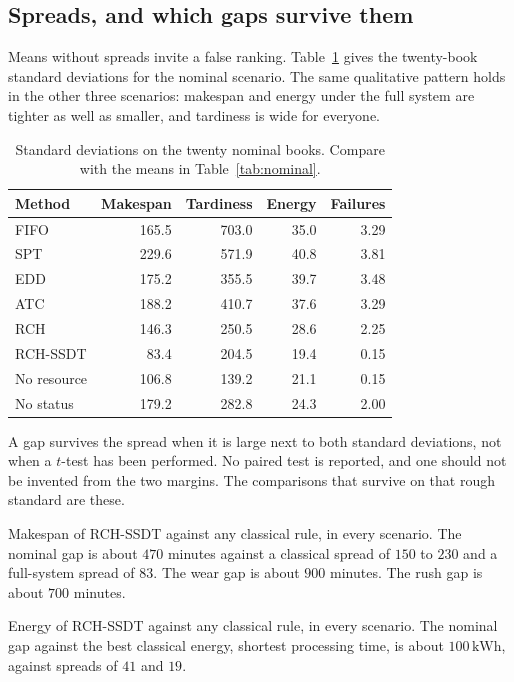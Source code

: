 \subsection{Spreads, and which gaps survive them}

Means without spreads invite a false ranking. Table~\ref{tab:nominal-std} gives the twenty-book standard deviations for the nominal scenario. The same qualitative pattern holds in the other three scenarios: makespan and energy under the full system are tighter as well as smaller, and tardiness is wide for everyone.

\begin{table}[ht]
\centering
\caption{Standard deviations on the twenty nominal books. Compare with the means in Table~\ref{tab:nominal}.}
\label{tab:nominal-std}
\small
\begin{tabular}{lrrrr}
\toprule
Method & Makespan & Tardiness & Energy & Failures \\
\midrule
FIFO & 165.5 & 703.0 & 35.0 & 3.29 \\
SPT & 229.6 & 571.9 & 40.8 & 3.81 \\
EDD & 175.2 & 355.5 & 39.7 & 3.48 \\
ATC & 188.2 & 410.7 & 37.6 & 3.29 \\
RCH & 146.3 & 250.5 & 28.6 & 2.25 \\
RCH-SSDT & 83.4 & 204.5 & 19.4 & 0.15 \\
No resource & 106.8 & 139.2 & 21.1 & 0.15 \\
No status & 179.2 & 282.8 & 24.3 & 2.00 \\
\bottomrule
\end{tabular}
\end{table}

A gap survives the spread when it is large next to both standard deviations, not when a \(t\)-test has been performed. No paired test is reported, and one should not be invented from the two margins. The comparisons that survive on that rough standard are these.

Makespan of RCH-SSDT against any classical rule, in every scenario. The nominal gap is about \(470\) minutes against a classical spread of \(150\) to \(230\) and a full-system spread of \(83\). The wear gap is about \(900\) minutes. The rush gap is about \(700\) minutes.

Energy of RCH-SSDT against any classical rule, in every scenario. The nominal gap against the best classical energy, shortest processing time, is about \(100\,\mathrm{kWh}\), against spreads of \(41\) and \(19\).

